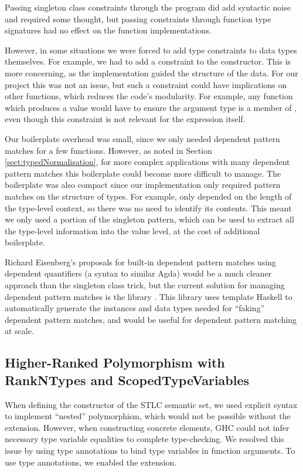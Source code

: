 Passing singleton class constraints through the program did add syntactic noise and required some thought, but passing constraints through function type signatures had no effect on the function implementations. 

However, in some situations we were forced to add type constraints to data types themselves. For example, we had to add a  constraint to the  constructor. This is more concerning, as the implementation guided the structure of the data. For our project this was not an issue, but such a constraint could have implications on other functions, which reduces the code's modularity. For example, any function which produces a  value would have to ensure the argument type is a member of , even though this constraint is not relevant for the expression itself.

Our boilerplate overhead was small, since we only needed dependent pattern matches for a few functions. However, as noted in Section \ref{sect:typedNormalisation}, for more complex applications with many dependent pattern matches this boilerplate could become more difficult to manage. The boilerplate was also compact since our implementation only required pattern matches on the structure of types. For example,  only depended on the length of the type-level context, so there was no need to identify its contents. This meant we only used a portion of the singleton pattern, which can be used to extract all the type-level information into the value level, at the cost of additional boilerplate.

Richard Eisenberg's proposals for built-in dependent pattern matches using dependent quantifiers \cite{GADTs} (a syntax to similar Agda) would be a much cleaner approach than the singleton class trick, but the current solution for managing dependent pattern matches is the  library \cite{singletonLibrary}. This library uses template Haskell to automatically generate the instances and data types needed for “faking” dependent pattern matches, and would be useful for dependent pattern matching at scale.

\subsection{Higher-Ranked Polymorphism with RankNTypes and ScopedTypeVariables}
\label{subsect:rankNTypes}

When defining the  constructor of the STLC semantic set, we used explicit  syntax to implement “nested” polymorphism, which would not be possible without the  extension. However, when constructing concrete  elements, GHC could not infer necessary type variable equalities to complete type-checking. We resolved this issue by using type annotations to bind type variables in function arguments. To use type annotations, we enabled the  extension.

